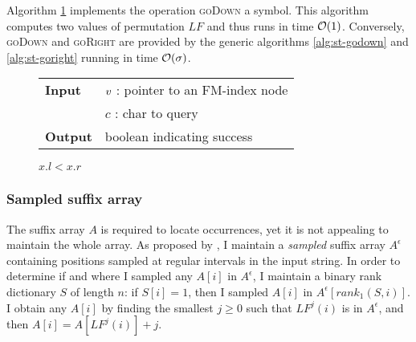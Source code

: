 Algorithm \ref{alg:fm-godownc} implements the operation \textsc{goDown} a symbol.
This algorithm computes two values of permutation $LF$ and thus runs in time $\mathcal{O}(1)$.
Conversely, \textsc{goDown} and \textsc{goRight} are provided by the generic algorithms \ref{alg:st-godown} and \ref{alg:st-goright} running in time $\mathcal{O}(\sigma)$.


\begin{figure*}
\begin{center}
\begin{minipage}[t]{.5\textwidth}
\begin{algorithm}[H]
\begin{tabular}{ll}
\textbf{Input}  & $v$ : pointer to an FM-index node\\
				& $c$ : char to query\\
\textbf{Output} & boolean indicating success\\
\end{tabular}
\begin{algorithmic}[1]
	\State \Return \False
\EndIf
{}
\State \Return $x.l < x.r$
\end{algorithmic}
\label{alg:fm-godownc}
\end{algorithm}
\end{minipage}
\end{center}
\end{figure*}

\subsubsection{Sampled suffix array}

The suffix array $A$ is required to locate occurrences, yet it is not appealing to maintain the whole array.
As proposed by \cite{Ferragina2000}, I maintain a \emph{sampled} suffix array $A^{\epsilon}$ containing positions sampled at regular intervals in the input string.
In order to determine if and where I sampled any $A[i]$ in $A^{\epsilon}$, I maintain a binary rank dictionary $S$ of length $n$: if $S[i]=1$, then I sampled $A[i]$ in $A^{\epsilon}[rank_1(S,i)]$.
I obtain any $A[i]$ by finding the smallest $j \geq 0$ such that $LF^j(i)$ is in $A^{\epsilon}$, and then $A[i] = A[LF^j(i)] + j$.

